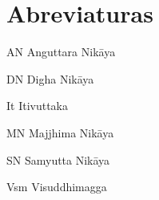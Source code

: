 \chapter{Abreviaturas}

AN Anguttara Nikāya

DN Digha Nikāya

It Itivuttaka

MN Majjhima Nikāya

SN Samyutta Nikāya

Vsm Visuddhimagga
